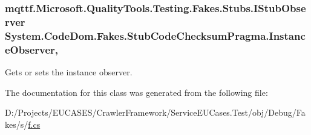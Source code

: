 \hypertarget{class_system_1_1_code_dom_1_1_fakes_1_1_stub_code_checksum_pragma_a57d0eafec11a82fc5b1f64454279d8fc}{
\subsubsection[{Instance\-Observer}]{\setlength{\rightskip}{0pt plus 5cm}mqttf.\-Microsoft.\-Quality\-Tools.\-Testing.\-Fakes.\-Stubs.\-I\-Stub\-Observer System.\-Code\-Dom.\-Fakes.\-Stub\-Code\-Checksum\-Pragma.\-Instance\-Observer\hspace{0.3cm}{\ttfamily [get]}, {\ttfamily [set]}}}\label{class_system_1_1_code_dom_1_1_fakes_1_1_stub_code_checksum_pragma_a57d0eafec11a82fc5b1f64454279d8fc}


Gets or sets the instance observer.



The documentation for this class was generated from the following file\-:\begin{DoxyCompactItemize}
\item 
D\-:/\-Projects/\-E\-U\-C\-A\-S\-E\-S/\-Crawler\-Framework/\-Service\-E\-U\-Cases.\-Test/obj/\-Debug/\-Fakes/s/\hyperlink{s_2f_8cs}{f.\-cs}\end{DoxyCompactItemize}

